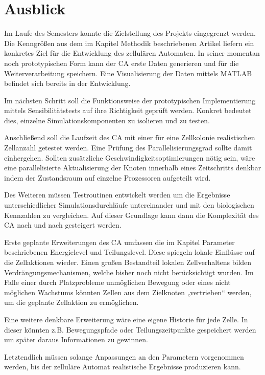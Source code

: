 \documentclass[11pt,a4paper,pointlessnumbers]{scrreprt}  %
\begin{document}
\chapter{Ausblick}
Im Laufe des Semesters konnte die Zielstellung des Projekts eingegrenzt werden. Die Kenngrößen aus dem im Kapitel Methodik beschriebenen Artikel liefern ein konkretes Ziel für die Entwicklung des zellulären Automaten. In seiner momentan noch prototypischen Form kann der CA erste Daten generieren und für die Weiterverarbeitung speichern. Eine Visualisierung der Daten mittels MATLAB befindet sich bereits in der Entwicklung. \par 
Im nächsten Schritt soll die Funktionsweise der prototypischen Implementierung mittels Sensibilitätstests auf ihre Richtigkeit geprüft werden. Konkret bedeutet dies, einzelne Simulationskomponenten zu isolieren und zu testen. \par 
Anschließend soll die Laufzeit des CA mit einer für eine Zellkolonie realistischen Zellanzahl getestet werden. Eine Prüfung des Parallelisierungsgrad sollte damit einhergehen. Sollten zusätzliche Geschwindigkeitsoptimierungen nötig sein, wäre eine parallelisierte Aktualisierung der Knoten innerhalb eines Zeitschritts denkbar indem der Zustandsraum auf einzelne Prozessoren aufgeteilt wird. \par 
Des Weiteren müssen Testroutinen entwickelt werden um die Ergebnisse unterschiedlicher Simulationsdurchläufe untereinander und mit den biologischen Kennzahlen zu vergleichen. Auf dieser Grundlage kann dann die Komplexität des CA nach und nach gesteigert werden. \par  
Erste geplante Erweiterungen des CA umfassen die im Kapitel Parameter beschriebenen Energielevel und Teilungslevel. Diese spiegeln lokale Einflüsse auf die Zellaktionen wieder. Einen großen Bestandteil lokalen Zellverhaltens bilden Verdrängungsmechanismen, welche bisher noch nicht berücksichtigt wurden. Im Falle einer durch Platzprobleme unmöglichen Bewegung oder eines nicht möglichen Wachstums könnten Zellen aus dem Zielknoten „vertrieben“ werden, um die geplante Zellaktion zu ermöglichen. \par 

Eine weitere denkbare Erweiterung wäre eine eigene Historie für jede Zelle. In dieser könnten z.B. Bewegungspfade oder Teilungszeitpunkte gespeichert werden um später daraus Informationen zu gewinnen. \par 
Letztendlich müssen solange Anpassungen an den Parametern vorgenommen werden, bis der zelluläre Automat realistische Ergebnisse produzieren kann.

 

\end{document}
